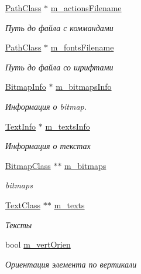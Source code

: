 \begin{DoxyCompactItemize}
\hyperlink{class_path_class}{Path\+Class} $\ast$ \hyperlink{class_interface_element_class_a686d61c39e4e1a34c87e00bd25c25ec9}{m\+\_\+actions\+Filename}
\begin{DoxyCompactList}\small\item\em Путь до файла с коммандами \end{DoxyCompactList}\item 
\hyperlink{class_path_class}{Path\+Class} $\ast$ \hyperlink{class_interface_element_class_a50f30f1e18f7c0a3756959c7b9ed42ce}{m\+\_\+fonts\+Filename}
\begin{DoxyCompactList}\small\item\em Путь до файла со шрифтами \end{DoxyCompactList}\item 
\hyperlink{struct_interface_element_class_1_1_bitmap_info}{Bitmap\+Info} $\ast$ \hyperlink{class_interface_element_class_a4a8fb4fa3b790b2d0eaf80825a9d0fa6}{m\+\_\+bitmaps\+Info}
\begin{DoxyCompactList}\small\item\em Информация о bitmap. \end{DoxyCompactList}\item 
\hyperlink{struct_interface_element_class_1_1_text_info}{Text\+Info} $\ast$ \hyperlink{class_interface_element_class_ad88939553c9fb78800fb538e9157c98f}{m\+\_\+texts\+Info}
\begin{DoxyCompactList}\small\item\em Информация о текстах \end{DoxyCompactList}\item 
\hyperlink{class_bitmap_class}{Bitmap\+Class} $\ast$$\ast$ \hyperlink{class_interface_element_class_a255444637943a29562ceb781706d664b}{m\+\_\+bitmaps}
\begin{DoxyCompactList}\small\item\em bitmaps \end{DoxyCompactList}\item 
\hyperlink{class_text_class}{Text\+Class} $\ast$$\ast$ \hyperlink{class_interface_element_class_a1356c46a8fcce7dd60c63e5531acc3a4}{m\+\_\+texts}
\begin{DoxyCompactList}\small\item\em Тексты \end{DoxyCompactList}\item 
bool \hyperlink{class_interface_element_class_a8bfae460b4034a9e9bdcaccadb7df367}{m\+\_\+vert\+Orien}
\begin{DoxyCompactList}\small\item\em Ориентация элемента по вертикали \end{DoxyCompactList}\item 

\end{DoxyCompactItemize}
